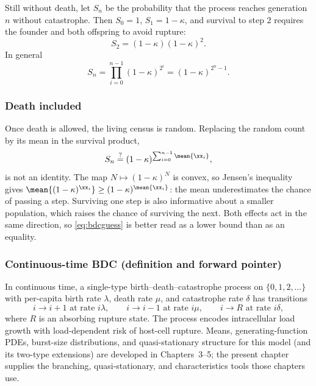 Still without death, let \(S_n\) be the probability that the process reaches generation \(n\) without catastrophe. Then \(S_0=1\), \(S_1=1-\kappa\), and survival to step \(2\) requires the founder and both offspring to avoid rupture:
\begin{equation*}
S_2 = (1-\kappa)(1-\kappa)^2 .
\end{equation*}
In general
\begin{equation}
\label{eq:bdcS}
S_n = \prod_{i=0}^{n-1}(1-\kappa)^{2^i} = (1-\kappa)^{2^n-1}.
\end{equation}

\subsubsection*{Death included}

Once death is allowed, the living census is random. Replacing the random count by its mean in the survival product,
\begin{equation}
\label{eq:bdcguess}
S_n \overset{?}{=} (1-\kappa)^{\sum_{i=0}^{n-1}\mean{\xx_i}} ,
\end{equation}
is not an identity. The map \(N\mapsto(1-\kappa)^N\) is convex, so Jensen's inequality gives \(\mean{(1-\kappa)^{\xx_i}}\ge(1-\kappa)^{\mean{\xx_i}}\): the mean underestimates the chance of passing a step. Surviving one step is also informative about a smaller population, which raises the chance of surviving the next. Both effects act in the same direction, so \cref{eq:bdcguess} is better read as a lower bound than as an equality.

\subsubsection*{Continuous-time BDC (definition and forward pointer)}

In continuous time, a single-type birth--death--catastrophe process on \(\{0,1,2,\dots\}\) with per-capita birth rate \(\lambda\), death rate \(\mu\), and catastrophe rate \(\delta\) has transitions
\begin{equation}
\label{eq:bdc-ct-rates}
i \to i+1 \text{ at rate } i\lambda,\qquad
i \to i-1 \text{ at rate } i\mu,\qquad
i \to R \text{ at rate } i\delta,
\end{equation}
where \(R\) is an absorbing rupture state. The process encodes intracellular load growth with load-dependent risk of host-cell rupture. Means, generating-function PDEs, burst-size distributions, and quasi-stationary structure for this model (and its two-type extensions) are developed in Chapters~3--5; the present chapter supplies the branching, quasi-stationary, and characteristics tools those chapters use.

